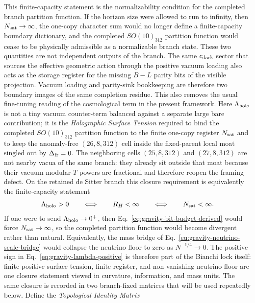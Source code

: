 \documentclass[11pt]{article}
\begin{document}
This finite-capacity statement is the normalizability condition for the
completed branch partition function. If the horizon size were allowed to run to
infinity, then $N_{\rm sat}\to\infty$, the one-copy character sum would no
longer define a finite-capacity boundary dictionary, and the completed
$SO(10)_{312}$ partition function would cease to be physically admissible as a
normalizable branch state.
These two quantities are not independent outputs of the branch. The same
$c_{\rm dark}$ sector that sources the effective geometric action through the
positive vacuum loading also acts as the storage register for the missing
$B-L$ parity bits of the visible projection. Vacuum loading and parity-sink
bookkeeping are therefore two boundary images of the same completion residue.
This also removes the usual fine-tuning reading of the cosmological term in the
present framework. Here $\Lambda_{\rm holo}$ is not a tiny vacuum counter-term
balanced against a separate large bare contribution; it is the
\emph{Holographic Surface Tension} required to bind the completed
$SO(10)_{312}$ partition function to the finite one-copy register
$N_{\rm sat}$ and to keep the anomaly-free $(26,8,312)$ cell inside the
fixed-parent local moat singled out by $\Delta_{\rm fr}=0$. The neighboring
cells $(25,8,312)$ and $(27,8,312)$ are not nearby vacua of the same branch:
they already sit outside that moat because their vacuum modular-$T$ powers are
fractional and therefore reopen the framing defect. On the retained de Sitter
branch this closure requirement is equivalently the finite-capacity statement
\begin{equation}
\label{eq:gravity-surface-tension-necessity}
 \Lambda_{\rm holo}>0
 \qquad\Longleftrightarrow\qquad
 R_H<\infty
 \qquad\Longleftrightarrow\qquad
 N_{\rm sat}<\infty.
\end{equation}
If one were to send $\Lambda_{\rm holo}\to0^+$, then
Eq.~\eqref{eq:gravity-bit-budget-derived} would force $N_{\rm sat}\to\infty$,
so the completed partition function would become divergent rather than
natural. Equivalently, the mass bridge of
Eq.~\eqref{eq:gravity-neutrino-scale-bridge} would collapse the neutrino floor
to zero as $N^{-1/4}\to0$. The positive sign in
Eq.~\eqref{eq:gravity-lambda-positive} is therefore part of the Bianchi lock
itself: finite positive surface tension, finite register, and non-vanishing
neutrino floor are one closure statement viewed in curvature, information, and
mass units.
The same closure is recorded in two branch-fixed matrices that will be used
repeatedly below. Define the \emph{Topological Identity Matrix}
\end{document}
